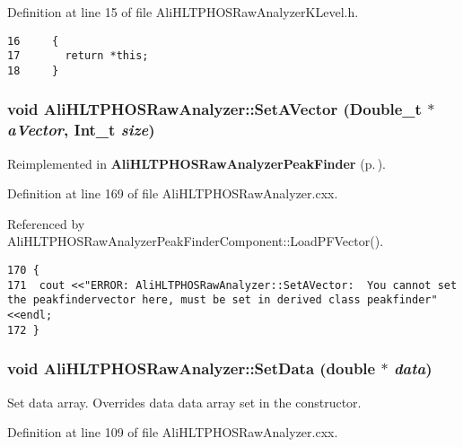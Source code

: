 Definition at line 15 of file Ali\-HLTPHOSRaw\-Analyzer\-KLevel.h.

\footnotesize\begin{verbatim}16     {
17       return *this; 
18     }
\end{verbatim}\normalsize 


\subsubsection{\setlength{\rightskip}{0pt plus 5cm}void Ali\-HLTPHOSRaw\-Analyzer::Set\-AVector (Double\_\-t $\ast$ {\em a\-Vector}, Int\_\-t {\em size})\hspace{0.3cm}{\tt  [virtual, inherited]}}\label{classAliHLTPHOSRawAnalyzer_AliHLTPHOSRawAnalyzerLMSa17}




Reimplemented in {\bf Ali\-HLTPHOSRaw\-Analyzer\-Peak\-Finder} {\rm (p.\,\pageref{classAliHLTPHOSRawAnalyzerPeakFinder_AliHLTPHOSRawAnalyzerPeakFindera5})}.

Definition at line 169 of file Ali\-HLTPHOSRaw\-Analyzer.cxx.

Referenced by Ali\-HLTPHOSRaw\-Analyzer\-Peak\-Finder\-Component::Load\-PFVector().

\footnotesize\begin{verbatim}170 {
171  cout <<"ERROR: AliHLTPHOSRawAnalyzer::SetAVector:  You cannot set the peakfindervector here, must be set in derived class peakfinder"<<endl;
172 }
\end{verbatim}\normalsize 


\subsubsection{\setlength{\rightskip}{0pt plus 5cm}void Ali\-HLTPHOSRaw\-Analyzer::Set\-Data (double $\ast$ {\em data})\hspace{0.3cm}{\tt  [inherited]}}\label{classAliHLTPHOSRawAnalyzer_AliHLTPHOSRawAnalyzerPeakFindera12}


Set data array. Overrides data data array set in the constructor. 

Definition at line 109 of file Ali\-HLTPHOSRaw\-Analyzer.cxx.

